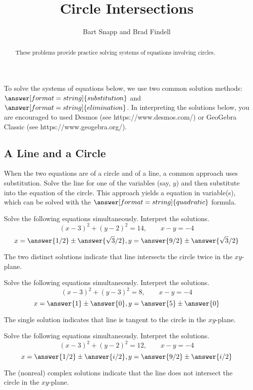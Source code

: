 \documentclass[nooutcomes]{ximera}
\title{Circle Intersections}
\author{Bart Snapp and Brad Findell}
\begin{document}
\begin{abstract}
These problems provide practice solving systems of equations involving circles. 
\end{abstract}
\maketitle

To solve the systems of equations below, we use two common solution methods: $\answer[format=string]{substitution}$ and $\answer[format=string]{elimination}$.  In interpreting the solutions below, you are encouraged to used Desmos (see https://www.desmos.com/) or GeoGebra Classic (see https://www.geogebra.org/).  

\subsection{A Line and a Circle}
When the two equations are of a circle and of a line, a common approach uses substitution.  Solve the line for one of the variables (say, $y$) and then substitute into the equation of the circle.  This approach yields a  equation in  variable(s), which can be solved with the $\answer[format=string]{quadratic}$ formula.  

\begin{problem}
Solve the following equations simultaneously.  Interpret the solutions.  
\[
(x-3)^2+(y-2)^2 = 14, \qquad  x - y = -4
\]
\[
x  = \answer{1/2} \pm \answer{\sqrt{3}/2}, y = \answer{9/2} \pm \answer{\sqrt{3}/2}
\]
\begin{hint}
The two distinct solutions indicate that line intersects the circle twice in the $xy$-plane.  
\end{hint}
\end{problem}


\begin{problem}
Solve the following equations simultaneously.  Interpret the solutions.  
\[
(x-3)^2+(y-3)^2 = 8, \qquad x - y = -4
\]
\[
x  = \answer{1} \pm \answer{0}, y = \answer{5} \pm \answer{0}
\]
\begin{hint}
The single solution indicates that line is tangent to the circle in the $xy$-plane.  
\end{hint}
\end{problem}


\begin{problem}
Solve the following equations simultaneously.  Interpret the solutions.  
\[
(x-3)^2+(y-2)^2 = 12, \qquad x - y = -4
\]
\[
x  = \answer{1/2} \pm \answer{i/2}, y = \answer{9/2} \pm \answer{i/2}
\]
\begin{hint}
The (nonreal) complex solutions indicate that the line does not intersect the circle in the $xy$-plane.  
\end{hint}
\end{problem}
\end{document}
